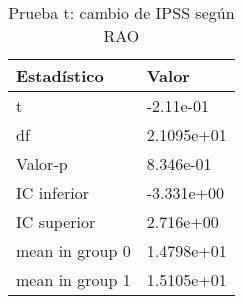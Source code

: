 \begin{table}[ht]
\centering
\caption{Prueba t: cambio de IPSS según RAO} 
\label{tab:prueba_t_rao_ipss}
\begin{tabular}{ll}
  \hline
Estadístico & Valor \\ 
  \hline
t & -2.11e-01 \\ 
  df & 2.1095e+01 \\ 
  Valor-p & 8.346e-01 \\ 
  IC inferior & -3.331e+00 \\ 
  IC superior & 2.716e+00 \\ 
  mean in group 0 & 1.4798e+01 \\ 
  mean in group 1 & 1.5105e+01 \\ 
   \hline
\end{tabular}
\end{table}
